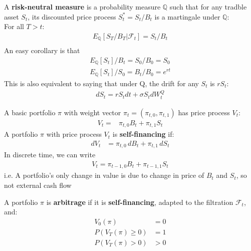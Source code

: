 \begin{definition}
    A \textbf{risk-neutral measure} is a probability measure $\mathbb{Q}$ such that 
    for any tradble asset $S_t$, its discounted price process $S_t^* = S_t / B_t$ is a martingale under $\mathbb{Q}$:\\
    For all $ T > t$:
    \begin{align*}
        E_{\mathbb{Q}}[S_T / B_T | \mathcal{F}_t] = S_t / B_t \\
    \end{align*}
An easy corollary is that
    \begin{align*}
        E_{\mathbb{Q}}[S_t] / B_t = S_0 / B_0 = S_0 \\
        E_{\mathbb{Q}}[S_t] / S_0 = B_t / B_0 = e^{rt} 
    \end{align*}
    This is also equivalent to saying that under Q, the drift for any $S_t$ is $r S_t$:
    \begin{align*}
        dS_t = r S_t dt + \sigma S_t dW_t^Q
    \end{align*}
\end{definition}
\begin{definition}
    A basic portfolio $\pi$ with weight vector $\pi_t = (\pi_{t, 0}, \pi_{t, 1})$ 
    has price process $V_t$:
    \begin{align*}
        V_t =& \pi_{t, 0} B_t + \pi_{t, 1} S_t
    \end{align*}
    A portfolio $\pi$ with price process $V_t$ is \textbf{self-financing} if:
    \begin{align*}
        dV_t &= \pi_{t, 0} \, dB_t + \pi_{t, 1} \, dS_t 
    \end{align*}
    In discrete time, we can write
    \begin{align*}
    V_t = \pi_{t-1, 0} B_t + \pi_{t-1, 1} S_t
    \end{align*}
    i.e. A portfolio's only change in value is due to change in price of $B_t$ and $S_t$, 
    so not external cash flow
\end{definition}

\begin{definition}
    A portfolio $\pi$ is \textbf{arbitrage} if it is \textbf{self-financing}, 
    adapted to the filtration $\mathcal{F}_t$, and:
    \begin{align*}
        V_0(\pi) &= 0 \\
        P(V_T(\pi) \geq 0) &= 1 \\
        P(V_T(\pi) > 0) &> 0
    \end{align*}
\end{definition}

